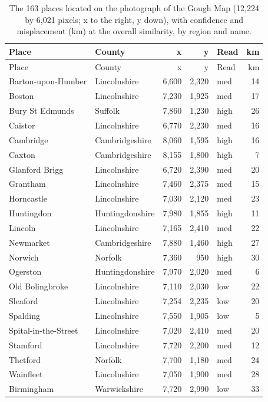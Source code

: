 \documentclass[11pt,a4paper]{article}
\begin{document}
\clearpage
{\footnotesize\setlength{\tabcolsep}{4pt}\begin{longtable}{p{5.4cm}p{4.2cm}rrlr}\caption{The 163 places located on the photograph of the Gough Map (12,224 by 6,021 pixels; x to the right, y down), with confidence and misplacement (km) at the overall similarity, by region and name.}\label{tab:located}\\\toprule Place & County & x & y & Read & km\\\midrule\endfirsthead\toprule Place & County & x & y & Read & km\\\midrule\endhead
Barton-upon-Humber & Lincolnshire & 6,600 & 2,320 & med & 14\\
Boston & Lincolnshire & 7,230 & 1,925 & med & 17\\
Bury St Edmunds & Suffolk & 7,860 & 1,230 & high & 26\\
Caistor & Lincolnshire & 6,770 & 2,230 & med & 16\\
Cambridge & Cambridgeshire & 8,060 & 1,595 & high & 16\\
Caxton & Cambridgeshire & 8,155 & 1,800 & high & 7\\
Glanford Brigg & Lincolnshire & 6,720 & 2,390 & med & 20\\
Grantham & Lincolnshire & 7,460 & 2,375 & med & 15\\
Horncastle & Lincolnshire & 7,030 & 2,120 & med & 23\\
Huntingdon & Huntingdonshire & 7,980 & 1,855 & high & 11\\
Lincoln & Lincolnshire & 7,165 & 2,410 & med & 22\\
Newmarket & Cambridgeshire & 7,880 & 1,460 & high & 27\\
Norwich & Norfolk & 7,360 & 950 & high & 30\\
Ogerston & Huntingdonshire & 7,970 & 2,020 & med & 6\\
Old Bolingbroke & Lincolnshire & 7,110 & 2,030 & low & 22\\
Sleaford & Lincolnshire & 7,254 & 2,235 & low & 20\\
Spalding & Lincolnshire & 7,550 & 1,905 & low & 5\\
Spital-in-the-Street & Lincolnshire & 7,020 & 2,410 & med & 20\\
Stamford & Lincolnshire & 7,720 & 2,200 & med & 12\\
Thetford & Norfolk & 7,700 & 1,180 & med & 24\\
Wainfleet & Lincolnshire & 7,050 & 1,900 & med & 28\\
Birmingham & Warwickshire & 7,720 & 2,990 & low & 33\\

\end{longtable}}
\end{document}
